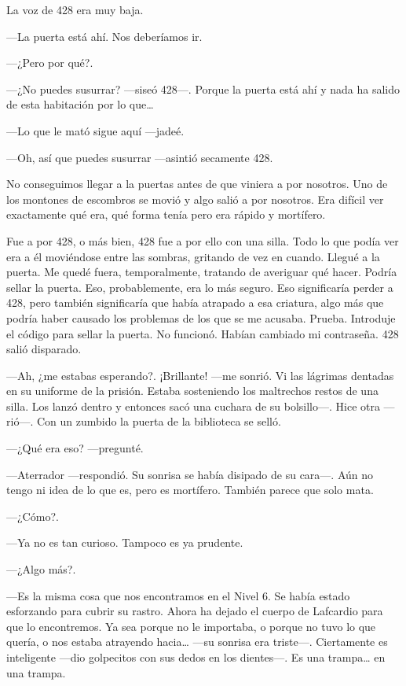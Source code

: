 La voz de 428 era muy baja.

---La puerta está ahí. Nos deberíamos ir.

---¿Pero por qué?.

---¿No puedes susurrar? ---siseó 428---. Porque la puerta está ahí y
nada ha salido de esta habitación por lo que\ldots{}

---Lo que le mató sigue aquí ---jadeé.

---Oh, así que puedes susurrar ---asintió secamente 428.

No conseguimos llegar a la puertas antes de que viniera a por nosotros.
Uno de los montones de escombros se movió y algo salió a por nosotros.
Era difícil ver exactamente qué era, qué forma tenía pero era rápido y
mortífero.

Fue a por 428, o más bien, 428 fue a por ello con una silla. Todo lo que
podía ver era a él moviéndose entre las sombras, gritando de vez en
cuando. Llegué a la puerta. Me quedé fuera, temporalmente, tratando de
averiguar qué hacer. Podría sellar la puerta. Eso, probablemente, era lo
más seguro. Eso significaría perder a 428, pero también significaría que
había atrapado a esa criatura, algo más que podría haber causado los
problemas de los que se me acusaba. Prueba. Introduje el código para
sellar la puerta. No funcionó. Habían cambiado mi contraseña. 428 salió
disparado.

---Ah, ¿me estabas esperando?. ¡Brillante! ---me sonrió. Vi las lágrimas
dentadas en su uniforme de la prisión. Estaba sosteniendo los maltrechos
restos de una silla. Los lanzó dentro y entonces sacó una cuchara de su
bolsillo---. Hice otra ---rió---. Con un zumbido la puerta de la
biblioteca se selló.

---¿Qué era eso? ---pregunté.

---Aterrador ---respondió. Su sonrisa se había disipado de su cara---.
Aún no tengo ni idea de lo que es, pero es mortífero. También parece que
solo mata.

---¿Cómo?.

---Ya no es tan curioso. Tampoco es ya prudente.

---¿Algo más?.

---Es la misma cosa que nos encontramos en el Nivel 6. Se había estado
esforzando para cubrir su rastro. Ahora ha dejado el cuerpo de Lafcardio
para que lo encontremos. Ya sea porque no le importaba, o porque no tuvo
lo que quería, o nos estaba atrayendo hacia\ldots{} ---su sonrisa era
triste---. Ciertamente es inteligente ---dio golpecitos con sus dedos en
los dientes---. Es una trampa\ldots{} en una trampa.

